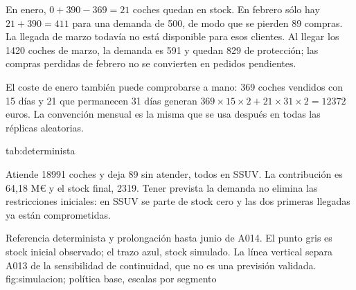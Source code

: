 En enero, $0+390-369=21$ coches quedan en stock. En febrero sólo hay
$21+390=411$ para una demanda de 500, de modo que se pierden 89 compras.
La llegada de marzo todavía no está disponible para esos clientes. Al llegar
los \num{1420} coches de marzo, la demanda es 591 y quedan 829 de protección;
las compras perdidas de febrero no se convierten en pedidos pendientes.

El coste de enero también puede comprobarse a mano: 369 coches vendidos con
15 días y 21 que permanecen 31 días generan
$369\times15\times2+21\times31\times2=\num{12372}$ euros. La convención mensual
es la misma que se usa después en todas las réplicas aleatorias.

{tab:determinista}{}

Atiende \num{18991} coches y deja \num{89} sin atender, todos en SSUV.
La contribución es 64,18 M\euro{} y el stock final, \num{2319}. Tener prevista
la demanda no elimina las restricciones iniciales: en SSUV se parte de stock
cero y las dos primeras llegadas ya están comprometidas.

\FloatBarrier
{}
{Referencia determinista y prolongación hasta junio de A014. El punto gris es
stock inicial observado; el trazo azul, stock simulado. La línea vertical separa
A013 de la sensibilidad de continuidad, que no es una previsión validada.}
{fig:simulacion}{; política base, escalas por segmento}
